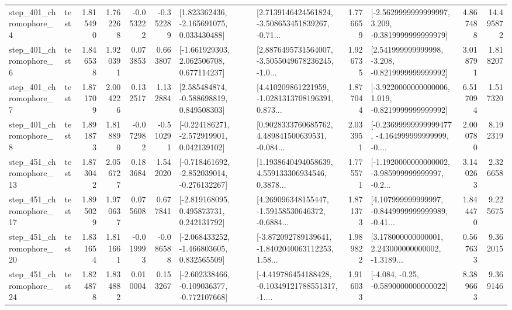 \begin{tabular}{llrrrrllrlrr}
   step\_401\_chromophore\_4 &      test &      1.815490 &    1.762268 &     -0.053222 & -0.352289 &    [1.823362436, -2.165691075, 0.033430488] &  [2.7139146424561824, -3.508653451839267, -0.71... &       1.776659 &  [-2.5629999999999997, 3.209, -0.3819999999999979] &            4.867488 &         14.495872 \\
   step\_401\_chromophore\_6 &      test &      1.846538 &    1.920391 &      0.073853 &  0.663807 &    [-1.661929303, 2.062506708, 0.677114237] &  [2.8876495731564007, -3.5055049678236245, -1.0... &       1.926735 &   [2.541999999999998, -3.208, -0.8219999999999992] &            3.018791 &          1.818207 \\
   step\_401\_chromophore\_7 &      test &      1.871709 &    2.004226 &      0.132517 &  1.132884 &    [2.585484874, -0.588698819, 0.849508303] &  [4.410209861221959, -1.0281313708196391, 0.873... &       1.877044 &  [-3.9220000000000006, 1.019, -0.8219999999999992] &            6.517094 &          1.517320 \\
   step\_401\_chromophore\_8 &      test &      1.891873 &    1.818890 &     -0.072982 & -0.510291 &   [-0.224186271, -2.572919901, 0.042139102] &  [0.9028333760685762, 4.489841500639531, -0.084... &       2.033951 &  [-0.23699999999999477, -4.164999999999999, -0.... &            2.000780 &          8.192319 \\
  step\_451\_chromophore\_13 &      test &      1.873042 &    2.056727 &      0.183684 &  1.542020 &  [-0.718461692, -2.852039014, -0.276132267] &  [1.1938640494058639, 4.559133306934546, 0.3878... &       1.775571 &  [-1.1920000000000002, -3.985999999999997, -0.2... &            3.140263 &          2.326658 \\
  step\_451\_chromophore\_17 &      test &      1.895029 &    1.970637 &      0.075608 &  0.677841 &    [-2.819168095, 0.495873731, 0.242131792] &  [4.269096348155447, -1.59158530646372, -0.6884... &       1.871373 &  [4.107999999999997, -0.8449999999999989, -0.41... &            1.844470 &          9.225675 \\
  step\_451\_chromophore\_20 &      test &      1.831654 &    1.811661 &     -0.019993 & -0.086588 &   [-2.068433252, -1.466803605, 0.832565509] &  [-3.872092789139641, -1.8402040063112253, 1.58... &       1.989822 &  [3.178000000000001, 2.243000000000002, -1.3189... &            0.567633 &          9.362015 \\
  step\_451\_chromophore\_24 &      test &      1.824878 &    1.834882 &      0.010004 &  0.153267 &  [-2.602338466, -0.109036377, -0.772107668] &  [-4.419786454188428, -0.10349121788551317, -1.... &       1.916033 &               [-4.084, -0.25, -0.5890000000000022] &            8.389663 &          9.369146 \\

\end{tabular}

